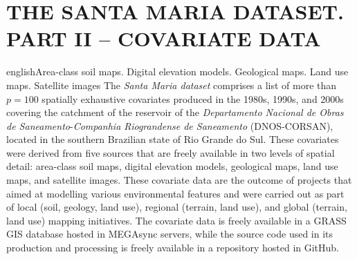 \artigotrue
\chapter{THE SANTA MARIA DATASET. PART II -- COVARIATE DATA}
\label{chap:chap05}



%

\def\enkeys{Area-class soil maps. Digital elevation models. Geological maps. Land use maps. Satellite images}

\begin{chapterabstract}{english}{\enkeys}
The \emph{Santa Maria dataset} comprises a list of more than $p = 100$ spatially exhaustive covariates 
produced in the 1980s, 1990s, and 2000s covering the catchment of the reservoir of the \textit{Departamento 
Nacional de Obras de Saneamento}-\textit{Companhia Riograndense de Saneamento} (DNOS-CORSAN), located in the 
southern Brazilian state of Rio Grande do Sul. These covariates were derived from five sources that are freely 
available in two levels of spatial detail: area-class soil maps, digital elevation models, geological maps, 
land use maps, and satellite images. These covariate data are the outcome of projects that aimed at modelling 
various environmental features and were carried out as part of local (soil, geology, land use), regional 
(terrain, land use), and global (terrain, land use) mapping initiatives. The covariate data is freely 
available in a GRASS GIS database hosted in MEGAsync servers, while the source code used in its production and 
processing is freely available in a repository hosted in GitHub.
\end{chapterabstract}

